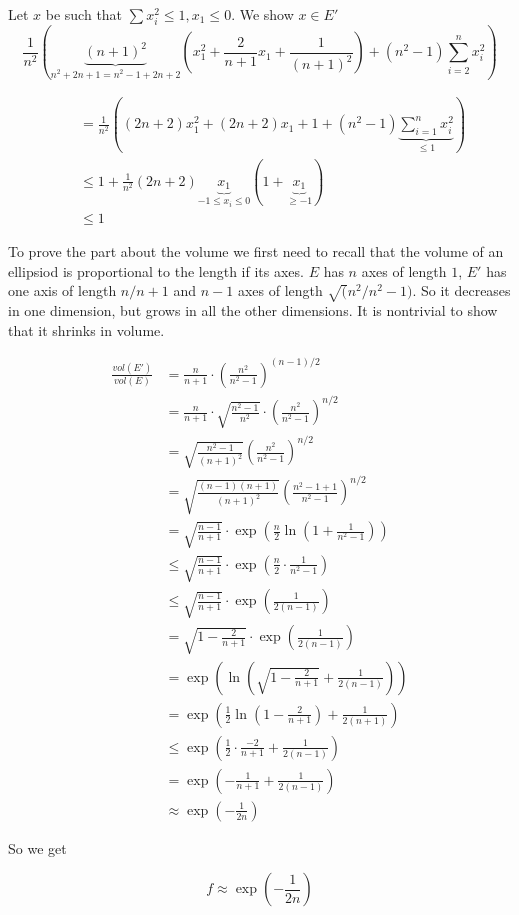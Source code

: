 \begin{pr} Let $x$ be such that $\sum x_i^2\leq 1, x_1\leq 0$. We show $x\in E'$
\[\frac{1}{n^2} \left( \underbrace{(n+1)^2}_{n^2+2n+1=n^2-1+2n+2} (x_1^2 + \frac{2}{n+1} x_1 + \frac{1}{(n+1)^2}) + (n^2-1)\sum_{i=2}^n x_i^2 \right)\]

\begin{align*}
\quad &= \frac{1}{n^2} \left((2n+2)x_1^2 + (2n+2)x_1+1+(n^2-1)\underbrace{\sum_{i=1}^n x_i^2}_{\leq 1} \right)\\
\quad &\leq 1+\frac{1}{n^2}(2n+2)\underbrace{x_1}_{-1\leq x_i\leq 0}(1+\underbrace{x_1}_{\geq -1})\\
\quad &\leq 1
\end{align*}

To prove the part about the volume we first need to recall that the volume of an ellipsiod is proportional to the length if its axes. $E$ has $n$ axes of length $1$, $E'$ has one axis of length $n/n+1$ and $n-1$ axes of length $\sqrt(n^2/n^2-1)$. So it decreases in one dimension, but grows in all the other dimensions. It is nontrivial to show that it shrinks in volume.

\begin{align*}\frac{vol(E')}{vol(E)}&=\frac{n}{n+1}\cdot \left(\frac{n^2}{n^2-1}\right)^{(n-1)/2}\\
&= \frac{n}{n+1}\cdot \sqrt{\frac{n^2-1}{n^2}} \cdot \left(\frac{n^2}{n^2-1}\right)^{n/2}\\
&=\sqrt{\frac{n^2-1}{(n+1)^2}} \left(\frac{n^2}{n^2-1}\right)^{n/2}\\
&=\sqrt{\frac{(n-1)(n+1)}{(n+1)^2}} \left(\frac{n^2-1+1}{n^2-1}\right)^{n/2}\\
&= \sqrt{\frac{n-1}{n+1}} \cdot \exp\left(\frac{n}{2} \ln (1+\frac{1}{n^2-1})\right)\\
&\leq \sqrt{\frac{n-1}{n+1}} \cdot \exp\left(\frac{n}{2} \cdot \frac{1}{n^2-1}\right)\\
&\leq \sqrt{\frac{n-1}{n+1}} \cdot \exp\left(\frac{1}{2(n-1)}\right)\\
&=\sqrt{1-\frac{2}{n+1}}\cdot \exp\left(\frac{1}{2(n-1)}\right)\\
&= \exp \left(\ln\left(\sqrt{1-\frac{2}{n+1}}+\frac{1}{2(n-1)}\right)\right)\\
&=\exp \left(\frac{1}{2}\ln (1-\frac{2}{n+1}) +\frac{1}{2(n+1)}\right)\\
&\leq \exp \left(\frac{1}{2} \cdot \frac{-2}{n+1} + \frac{1}{2(n-1)}\right)\\
&= \exp \left(-\frac{1}{n+1}+\frac{1}{2(n-1)}\right)\\
&\approx \exp \left(-\frac{1}{2n}\right)
\end{align*}

So we get

\[f \approx \exp \left(-\frac{1}{2n}\right)\]

\end{pr}

